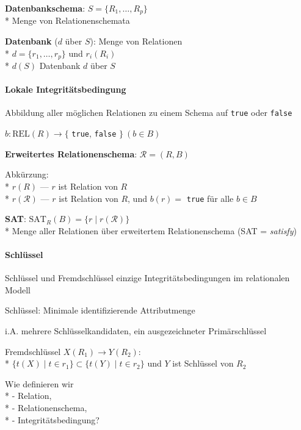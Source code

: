 \begin{items}
	\item \textbf{Datenbankschema}: \( S = \{ R_1, \dots, R_p \} \) \\* Menge von Relationenschemata
	\item \textbf{Datenbank} (\( d \) über \( S \)): Menge von Relationen \\* \( d = \{ r_1, \dots, r_p \} \) und \( r_i(R_i) \) \\* \( d(S) \) Datenbank \( d \) über \( S \)
\end{items}

\paragraph{Lokale Integritätsbedingung}
\begin{items}
	\item Abbildung aller möglichen Relationen zu einem Schema auf \lstinline{true} oder \lstinline{false}
	\item \( b: \text{REL}(R) \to \{ \) \lstinline{true}, \lstinline{false} \( \} \ (b \in B) \)
	\item \textbf{Erweitertes Relationenschema}: \( \mathcal{R} = (R, B) \)
	\item Abkürzung: \\* \( r(R) \) --- \( r \) ist Relation von \( R \) \\* \( r(\mathcal{R}) \) --- \( r \) ist Relation von \( R \), und \( b(r)= \) \lstinline{true} für alle \( b \in B \)
	\item \textbf{SAT}: \( \text{SAT}_R(B) = \{ r \mid r(\mathcal{R}) \} \) \\* Menge aller Relationen über erweitertem Relationenschema (SAT = \emph{satisfy})
\end{items}

\paragraph{Schlüssel}
\begin{items}
	\item Schlüssel und Fremdschlüssel einzige Integritätsbedingungen im relationalen Modell
	\item Schlüssel: Minimale identifizierende Attributmenge
	\item i.A. mehrere Schlüsselkandidaten, ein ausgezeichneter Primärschlüssel
	\item Fremdschlüssel \( X(R_1) \to Y(R_2) \): \\*
	\( \{ t(X) \mid t \in r_1 \} \subset \{ t(Y) \mid t \in r_2 \}  \) und $Y$ ist Schlüssel von $R_2$
\end{items}

\begin{fragen}
	\item Wie definieren wir \\*
		- Relation, \\*
		- Relationenschema, \\*
		- Integritätsbedingung?
\end{fragen}